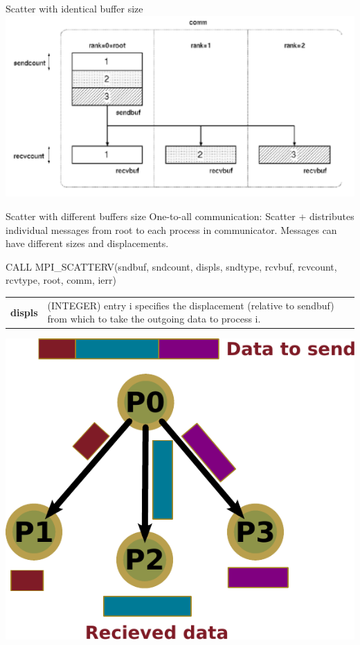 \documentclass[aspectratio=43]{beamer}
\begin{document}
\begin{frame}{Scatter with identical buffer size}
\includegraphics[scale=0.5]{03.MPI_Coll/scatter1.pdf}
\end{frame}

\begin{frame}[fragile]{Scatter with different buffers size}
One-to-all communication: Scatter + distributes individual messages from root to each process in communicator. Messages can have different sizes and displacements.\\
\begin{Fortranlisting}[]{}
CALL MPI_SCATTERV(sndbuf, sndcount, displs, sndtype,
                  rcvbuf, rcvcount, rcvtype,
                  root, comm, ierr)
\end{Fortranlisting}
\begin{black1block}{}
\begin{tabular}{rp{8cm}}
\textbf{displs} & (INTEGER) entry i specifies the displacement (relative to sendbuf) from which to take the outgoing data to process i.\\
\end{tabular}
\end{black1block}
\begin{center}
\includegraphics[scale=0.33]{03.MPI_Coll/scatterv.pdf}
\end{center}
\end{frame}
\end{document}
